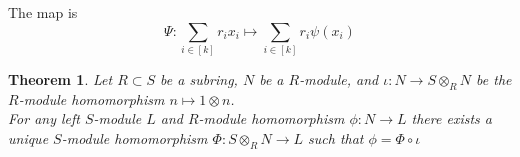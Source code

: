 \documentclass{article}
\theoremstyle{plain}
\newtheorem{thm}{Theorem}[section]
\theoremstyle{definition}
\theoremstyle{remark}
\begin{document}
  The map is \[\Psi:\sum_{i\in[k]}r_ix_i\mapsto \sum_{i\in[k]}r_i\psi(x_i)\]
  \begin{thm}
    Let $R \subset S$  be a subring, $N$ be a $R$-module, and 
    $\iota:N\to S\otimes_R N$ be the $R$-module homomorphism 
    $n \mapsto 1\otimes n$.\\[1em]
    For any left $S$-module $L$ and $R$-module homomorphism
    $\phi:N\to L$ there exists a unique $S$-module homomorphism
    $\Phi:S\otimes_R N\to L$ such that $\phi=\Phi\circ\iota$
\begin{center}\end{center}
  \end{thm}
\end{document}
